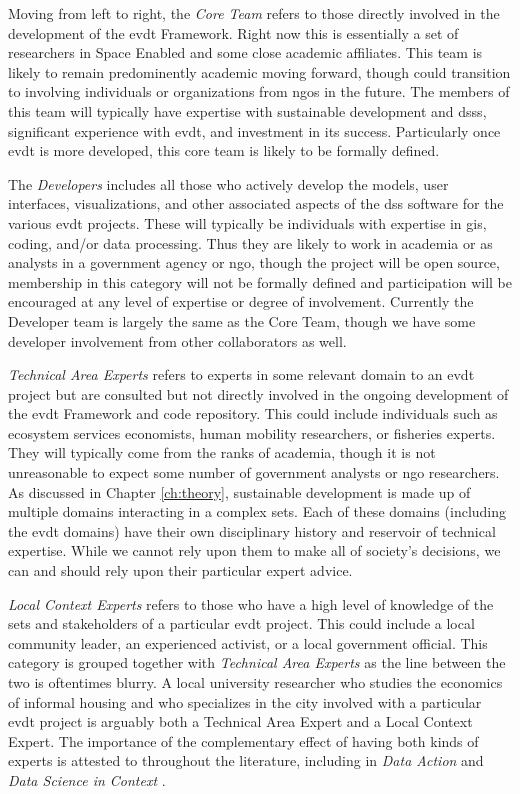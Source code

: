 Moving from left to right, the \textit{Core Team} refers to those directly involved in the development of the \ac{evdt} Framework. Right now this is essentially a set of researchers in Space Enabled and some close academic affiliates. This team is likely to remain predominently academic moving forward, though could transition to involving individuals or organizations from \acp{ngo} in the future. The members of this team will typically have expertise with sustainable development and \acp{dss}, significant experience with \ac{evdt}, and investment in its success. Particularly once \ac{evdt} is more developed, this core team is likely to be formally defined.

The \textit{Developers} includes all those who actively develop the models, user interfaces, visualizations, and other associated aspects of the \ac{dss} software for the various \ac{evdt} projects. These will typically be individuals with expertise in \ac{gis}, coding, and/or data processing. Thus they are likely to work in academia or as analysts in a government agency or \ac{ngo}, though the project will be open source, membership in this category will not be formally defined and participation will be encouraged at any level of expertise or degree of involvement. Currently the Developer team is largely the same as the Core Team, though we have some developer involvement from other collaborators as well.

\textit{Technical Area Experts} refers to experts in some relevant domain to an \ac{evdt} project but are consulted but not directly involved in the ongoing development of the \ac{evdt} Framework and code repository. This could include individuals such as ecosystem services economists, human mobility researchers, or fisheries experts. They will typically come from the ranks of academia, though it is not unreasonable to expect some number of government analysts or \ac{ngo} researchers. As discussed in Chapter \ref{ch:theory}, sustainable development is made up of multiple domains interacting in a complex \ac{sets}. Each of these domains (including the \ac{evdt} domains) have their own disciplinary history and reservoir of technical expertise. While we cannot rely upon them to make all of society's decisions, we can and should rely upon their particular expert advice. 

\textit{Local Context Experts} refers to those who have a high level of knowledge of the \ac{sets} and stakeholders of a particular \ac{evdt} project. This could include a local community leader, an experienced activist, or a local government official. This category is grouped together with \textit{Technical Area Experts} as the line between the two is oftentimes blurry. A local university researcher who studies the economics of informal housing and who specializes in the city involved with a particular \ac{evdt} project is arguably both a Technical Area Expert and a Local Context Expert. The importance of the complementary effect of having both kinds of experts is attested to throughout the literature, including in \textit{Data Action} \cite{williamsDataActionUsing2020} and \textit{Data Science in Context} \cite{spectorDataScienceContext2022}. 

